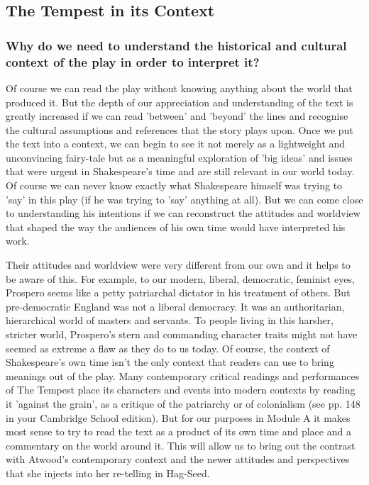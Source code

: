 	\subsection{The Tempest in its Context}
		\subsubsection{Why do we need to understand the historical and cultural context of the play in order to interpret it?}
			Of course we can read the play without knowing anything about the world that produced it. But the depth of our appreciation and understanding of the text is greatly increased if we can read 'between' and 'beyond' the lines and recognise the cultural assumptions and references that the story plays upon. Once we put the text into a context, we can begin to see it not merely as a lightweight and unconvincing fairy-tale but as a meaningful exploration of 'big ideas' and issues that were urgent in Shakespeare's time and are still relevant in our world today. Of course we can never know exactly what Shakespeare himself was trying to 'say' in this play (if he was trying to 'say' anything at all). But we can come close to understanding his intentions if we can reconstruct the attitudes and worldview that shaped the way the audiences of his own time would have interpreted his work.

			Their attitudes and worldview were very different from our own and it helps to be aware of this. For example, to our modern, liberal, democratic, feminist eyes, Prospero seems like a petty patriarchal dictator in his treatment of others. But pre-democratic England was not a liberal democracy. It was an authoritarian, hierarchical world of masters and servants. To people living in this harsher, stricter world, Prospero's stern and commanding character traits might not have seemed as extreme a flaw as they do to us today. Of course, the context of Shakespeare's own time isn't the only context that readers can use to bring meanings out of the play. Many contemporary critical readings and performances of The Tempest place its characters and events into modern contexts by reading it 'against the grain', as a critique of the patriarchy or of colonialism (see pp. 148 in your Cambridge School edition). But for our purposes in Module A it makes most sense to try to read the text as a product of its own time and place and a commentary on the world around it. This will allow us to bring out the contrast with Atwood's contemporary context and the newer attitudes and perspectives that she injects into her re-telling in Hag-Seed.

